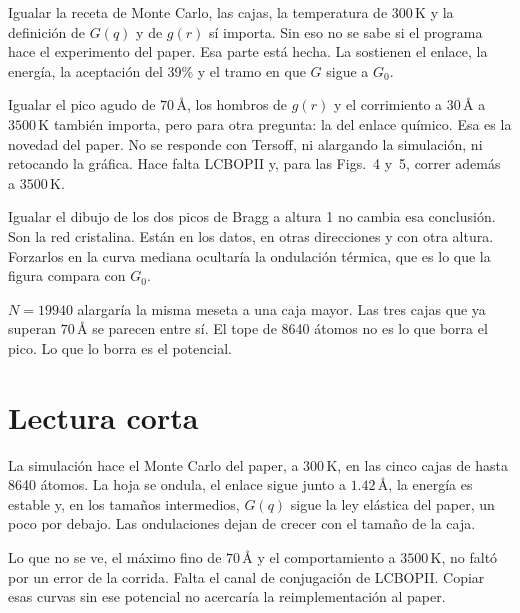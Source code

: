\documentclass[11pt,a4paper]{article}
\begin{document}
Igualar la receta de Monte Carlo, las cajas, la temperatura de $300\,\mathrm{K}$ y la definición de $G(q)$ y de $g(r)$ sí importa.
Sin eso no se sabe si el programa hace el experimento del paper.
Esa parte está hecha.
La sostienen el enlace, la energía, la aceptación del 39\% y el tramo en que $G$ sigue a $G_0$.

Igualar el pico agudo de $70\,\text{\AA}$, los hombros de $g(r)$ y el corrimiento a $30\,\text{\AA}$ a $3500\,\mathrm{K}$ también importa, pero para otra pregunta: la del enlace químico.
Esa es la novedad del paper.
No se responde con Tersoff, ni alargando la simulación, ni retocando la gráfica.
Hace falta LCBOPII y, para las Figs.~4 y~5, correr además a $3500\,\mathrm{K}$.

Igualar el dibujo de los dos picos de Bragg a altura 1 no cambia esa conclusión.
Son la red cristalina.
Están en los datos, en otras direcciones y con otra altura.
Forzarlos en la curva mediana ocultaría la ondulación térmica, que es lo que la figura compara con $G_0$.

$N=19940$ alargaría la misma meseta a una caja mayor.
Las tres cajas que ya superan $70\,\text{\AA}$ se parecen entre sí.
El tope de 8640 átomos no es lo que borra el pico.
Lo que lo borra es el potencial.

\enlargethispage{4\baselineskip}
\section{Lectura corta}

La simulación hace el Monte Carlo del paper, a $300\,\mathrm{K}$, en las cinco cajas de hasta 8640 átomos.
La hoja se ondula, el enlace sigue junto a $1.42\,\text{\AA}$, la energía es estable y, en los tamaños intermedios, $G(q)$ sigue la ley elástica del paper, un poco por debajo.
Las ondulaciones dejan de crecer con el tamaño de la caja.

Lo que no se ve, el máximo fino de $70\,\text{\AA}$ y el comportamiento a $3500\,\mathrm{K}$, no faltó por un error de la corrida.
Falta el canal de conjugación de LCBOPII.
Copiar esas curvas sin ese potencial no acercaría la reimplementación al paper.
\end{document}
